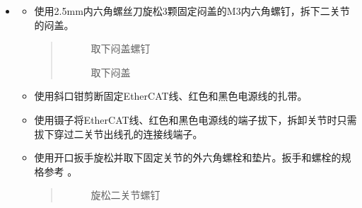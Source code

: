 \documentclass[a4paper,11pt,english,openany,oneside]{sphinxmanual}
\begin{document}
\begin{itemize}
\begin{itemize}
\begin{quote}
\begin{figure}[H]
\noindent{}
\caption{取下装饰环}\label{\detokenize{_u66f4_u6362_u5173_u8282:id113}}\end{figure}
\end{quote}

\end{itemize}

\item {} 
\sphinxAtStartPar
{}
\begin{itemize}
\item {} 
\sphinxAtStartPar
使用2.5mm内六角螺丝刀旋松3颗固定闷盖的M3内六角螺钉，拆下二关节的闷盖。
\begin{quote}

\begin{figure}[H]
\centering
\capstart

\noindent{}
\caption{取下闷盖螺钉}\label{\detokenize{_u66f4_u6362_u5173_u8282:id114}}\end{figure}

\begin{figure}[H]
\centering
\capstart

\noindent{}
\caption{取下闷盖}\label{\detokenize{_u66f4_u6362_u5173_u8282:id115}}\end{figure}
\end{quote}

\item {} 
\sphinxAtStartPar
使用斜口钳剪断固定EtherCAT线、红色和黑色电源线的扎带。

\item {} 
\sphinxAtStartPar
使用镊子将EtherCAT线、红色和黑色电源线的端子拔下，拆卸关节时只需拔下穿过二关节出线孔的连接线端子。

\item {} 
\sphinxAtStartPar
使用开口扳手旋松并取下固定关节的外六角螺栓和垫片。扳手和螺栓的规格参考 {\hyperref[\detokenize{_u66f4_u6362_u5173_u8282:id9}]{}} 。
\begin{quote}

\begin{figure}[H]
\centering
\capstart

\noindent{}
\caption{旋松二关节螺钉}\label{\detokenize{_u66f4_u6362_u5173_u8282:id116}}\end{figure}
\end{quote}


\end{itemize}
\end{itemize}
\end{document}
